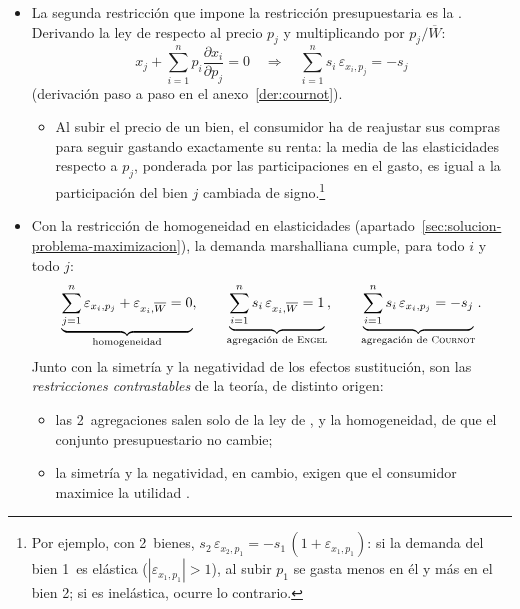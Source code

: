 \documentclass[11pt]{article}
\begin{document}
\begin{itemize}
\item La segunda restricción que impone la restricción presupuestaria es la . Derivando la ley de  respecto al precio $p_j$ y multiplicando por $p_j/\overline{W}$:
  \begin{equation}
  x_j+\sum_{i=1}^{n}p_i\frac{\partial x_i}{\partial p_j}=0\quad\Longrightarrow\quad\sum_{i=1}^{n}s_i\,\varepsilon_{x_i,p_j}=-s_j \label{eq:agregacion-cournot}
  \end{equation}
  (derivación paso a paso en el anexo~\ref{der:cournot}).
  \begin{itemize}
  \item Al subir el precio de un bien, el consumidor ha de reajustar sus compras para seguir gastando exactamente su renta: la media de las elasticidades respecto a $p_j$, ponderada por las participaciones en el gasto, es igual a la participación del bien $j$ cambiada de signo.\footnote{Por ejemplo, con 2~bienes, $s_2\,\varepsilon_{x_2,p_1}=-s_1\,(1+\varepsilon_{x_1,p_1})$: si la demanda del bien 1~es elástica ($|\varepsilon_{x_1,p_1}|>1$), al subir $p_1$ se gasta menos en él y más en el bien 2; si es inelástica, ocurre lo contrario.}
  \end{itemize}
\item Con la restricción de homogeneidad en elasticidades (apartado~\ref{sec:solucion-problema-maximizacion}), la demanda marshalliana cumple, para todo $i$ y todo $j$:
  \begin{equation}
  \underbrace{\sum_{j=1}^{n}\varepsilon_{x_i,p_j}+\varepsilon_{x_i,\overline{W}}=0}_{\text{homogeneidad}},\qquad\underbrace{\sum_{i=1}^{n}s_i\,\varepsilon_{x_i,\overline{W}}=1}_{\text{agregación de \textsc{Engel}}},\qquad\underbrace{\sum_{i=1}^{n}s_i\,\varepsilon_{x_i,p_j}=-s_j}_{\text{agregación de \textsc{Cournot}}}. \label{eq:restricciones-demanda}
  \end{equation}
  Junto con la simetría y la negatividad de los efectos sustitución, son las \emph{restricciones contrastables} de la teoría, de distinto origen:
  \begin{itemize}
  \item las 2~agregaciones salen solo de la ley de , y la homogeneidad, de que el conjunto presupuestario no cambie;
  \item la simetría y la negatividad, en cambio, exigen que el consumidor maximice la utilidad .
  \end{itemize}
\end{itemize}
\end{document}
